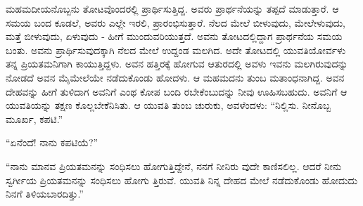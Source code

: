 ಮಹಮದೀಯನೊಬ್ಬನು ತೋಟವೊಂದರಲ್ಲಿ ಪ್ರಾರ್ಥಿಸುತ್ತಿದ್ದ. ಅವರು ಪ್ರಾರ್ಥನೆಯನ್ನು ತಪ್ಪದೆ ಮಾಡುತ್ತಾರೆ. ಆ ಸಮಯ ಬಂದ ಕೂಡಲೆ, ಅವರು ಎಲ್ಲೇ ಇರಲಿ, ಪ್ರಾರಂಭಿಸುತ್ತಾರೆ. ನೆಲದ ಮೇಲೆ ಬೀಳುವುದು, ಮೇಲೇಳುವುದು, ಮತ್ತೆ ಬೀಳುವುದು, ಏಳುವುದು - ಹೀಗೆ ಮುಂದುವರಿಯುತ್ತದೆ. ಅವನು ತೋಟದಲ್ಲಿದ್ದಾಗ ಪ್ರಾರ್ಥನೆಯ ಸಮಯ ಬಂತು. ಅವನು ಪ್ರಾರ್ಥಿಸುವುದಕ್ಕಾಗಿ ನೆಲದ ಮೇಲೆ ಉದ್ದಂಡ ಮಲಗಿದ. ಅದೇ ತೋಟದಲ್ಲಿ ಯುವತಿಯೋರ್ವಳು ತನ್ನ ಪ್ರಿಯತಮನಿಗಾಗಿ ಕಾಯುತ್ತಿದ್ದಳು. ಅವನ ಹತ್ತಿರಕ್ಕೆ ಹೋಗುವ ಆತುರದಲ್ಲಿ ಅವಳು ಇವನು ಮಲಗಿರುವುದನ್ನು ನೋಡದೆ ಅವನ ಮೈಮೇಲೆಯೇ ನಡೆದುಕೊಂಡು ಹೋದಳು. ಆ ಮಹಮದನು ತುಂಬ ಮತಾಂಧನಾಗಿದ್ದ. ಅವನ ದೇಹವನ್ನು ಹೀಗೆ ತುಳಿದಾಗ ಅವನಿಗೆ ಎಂಥ ಕೋಪ ಬಂದಿ ರಬೇಕೆಂಬುದನ್ನು ನೀವು ಊಹಿಸಬಹುದು. ಅವನಿಗೆ ಆ ಯುವತಿಯನ್ನು ತಕ್ಷಣ ಕೊಲ್ಲಬೇಕೆನಿಸಿತು. ಆ ಯುವತಿ ತುಂಬ ಚುರುಕು, ಅವಳೆಂದಳು: “ನಿಲ್ಲಿಸು. ನೀನೊಬ್ಬ ಮೂರ್ಖ, ಕಪಟಿ.”

“ಏನೆಂದೆ! ನಾನು ಕಪಟಿಯೆ?”

“ನಾನು ಮಾನವ ಪ್ರಿಯತಮನನ್ನು ಸಂಧಿಸಲು ಹೋಗುತ್ತಿದ್ದೇನೆ, ನನಗೆ ನೀನಿರು ವುದೇ ಕಾಣಿಸಲಿಲ್ಲ. ಆದರೆ ನೀನು ಸ್ವರ್ಗೀಯ ಪ್ರಿಯತಮನನ್ನು ಸಂಧಿಸಲು ಹೋಗು ತ್ತಿರುವೆ. ಯುವತಿ ನಿನ್ನ ದೇಹದ ಮೇಲೆ ನಡೆದುಕೊಂಡು ಹೋದುದು ನಿನಗೆ ತಿಳಿಯಬಾರದಿತ್ತು.”

